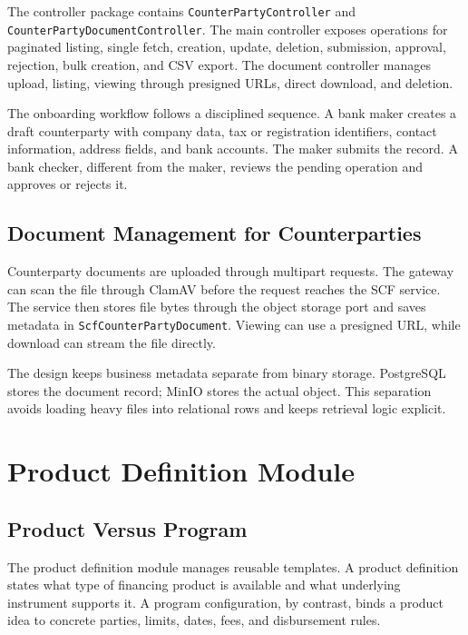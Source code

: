 The controller package contains \texttt{CounterPartyController} and \texttt{CounterPartyDocumentController}. The main controller exposes operations for paginated listing, single fetch, creation, update, deletion, submission, approval, rejection, bulk creation, and CSV export. The document controller manages upload, listing, viewing through presigned URLs, direct download, and deletion.

The onboarding workflow follows a disciplined sequence. A bank maker creates a draft counterparty with company data, tax or registration identifiers, contact information, address fields, and bank accounts. The maker submits the record. A bank checker, different from the maker, reviews the pending operation and approves or rejects it.

\subsection{Document Management for Counterparties}
\label{subsec:counterparty_documents}

Counterparty documents are uploaded through multipart requests. The gateway can scan the file through ClamAV before the request reaches the SCF service. The service then stores file bytes through the object storage port and saves metadata in \texttt{ScfCounterPartyDocument}. Viewing can use a presigned URL, while download can stream the file directly.

The design keeps business metadata separate from binary storage. PostgreSQL stores the document record; MinIO stores the actual object. This separation avoids loading heavy files into relational rows and keeps retrieval logic explicit.

\section{Product Definition Module}
\label{sec:product_definition_module}

\subsection{Product Versus Program}
\label{subsec:product_vs_program}

The product definition module manages reusable templates. A product definition states what type of financing product is available and what underlying instrument supports it. A program configuration, by contrast, binds a product idea to concrete parties, limits, dates, fees, and disbursement rules.

